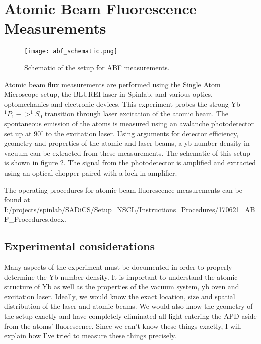 \documentclass[12pt, a4paper]{article}
\begin{document}
\section{Atomic Beam Fluorescence Measurements}
\begin{wrapfigure}{r}{0.5\textwidth}
  \texttt{[image: abf\_schematic.png]}
  \vspace*{-3mm}
  \caption{Schematic of the setup for ABF measurements.}
\end{wrapfigure}
Atomic beam flux measurements are performed using the Single Atom Microscope setup, the BLUREI laser in Spinlab, and various optics, optomechanics and electronic devices. This experiment probes the strong Yb $^{1}P_{1} -> ^{1}S_{0}$ transition through laser excitation of the atomic beam. The spontaneous emission of the atoms is measured using an avalanche photodetector set up at $90^{\circ}$ to the excitation laser. Using arguments for detector efficiency, geometry and properties of the atomic and laser beams, a yb number density in vacuum can be extracted from these measurements. The schematic of this setup is shown in figure 2. The signal from the photodetector is amplified and extracted using an optical chopper paired with a lock-in amplifier.

The operating procedures for atomic beam fluorescence measurements can be found at I:/projects/spinlab/SADiCS/Setup\_NSCL/Instructions\_Procedures/170621\_ABF\_Procedures.docx.
 
\subsection{Experimental considerations}
Many aspects of the experiment must be documented in order to properly determine the Yb number density. It is important to understand the atomic structure of Yb as well as the properties of the vacuum system, yb oven and excitation laser. Ideally, we would know the exact location, size and spatial distribution of the laser and atomic beams. We would also know the geometry of the setup exactly and have completely eliminated all light entering the APD aside from the atoms' fluorescence. Since we can't know these things exactly, I will explain how I've tried to measure these things precisely. 
\end{document}
